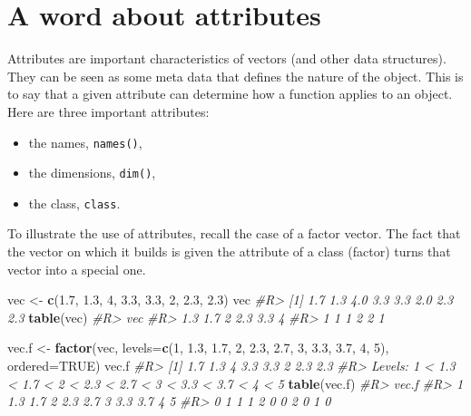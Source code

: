 \documentclass[]{book}
\newenvironment{Shaded}{}{}
\newcommand{\CommentTok}[1]{\textcolor[rgb]{0.38,0.63,0.69}{\textit{#1}}}
\newcommand{\DataTypeTok}[1]{\textcolor[rgb]{0.56,0.13,0.00}{#1}}
\newcommand{\DecValTok}[1]{\textcolor[rgb]{0.25,0.63,0.44}{#1}}
\newcommand{\FloatTok}[1]{\textcolor[rgb]{0.25,0.63,0.44}{#1}}
\newcommand{\KeywordTok}[1]{\textcolor[rgb]{0.00,0.44,0.13}{\textbf{#1}}}
\newcommand{\NormalTok}[1]{#1}
\newcommand{\OtherTok}[1]{\textcolor[rgb]{0.00,0.44,0.13}{#1}}
\newcommand{\StringTok}[1]{\textcolor[rgb]{0.25,0.44,0.63}{#1}}
\providecommand{\tightlist}{%
  \setlength{\itemsep}{0pt}\setlength{\parskip}{0pt}}
\theoremstyle{definition}
\theoremstyle{definition}
\theoremstyle{definition}
\theoremstyle{remark}
\begin{document}
\hypertarget{a-word-about-attributes}{%
\section{A word about attributes}\label{a-word-about-attributes}}

Attributes are important characteristics of vectors (and other data
structures).\\
They can be seen as some meta data that defines the nature of the
object. This is to say that a given attribute can determine how a
function applies to an object. Here are three important attributes:

\begin{itemize}
\tightlist
\item
  the names, \texttt{names()},
\item
  the dimensions, \texttt{dim()},
\item
  the class, \texttt{class}.
\end{itemize}

To illustrate the use of attributes, recall the case of a factor vector.
The fact that the vector on which it builds is given the attribute of a
class (factor) turns that vector into a special one.

\begin{Shaded}
\begin{Highlighting}[]
\NormalTok{vec <-}\StringTok{ }\KeywordTok{c}\NormalTok{(}\FloatTok{1.7}\NormalTok{, }\FloatTok{1.3}\NormalTok{, }\DecValTok{4}\NormalTok{, }\FloatTok{3.3}\NormalTok{, }\FloatTok{3.3}\NormalTok{, }\DecValTok{2}\NormalTok{, }\FloatTok{2.3}\NormalTok{, }\FloatTok{2.3}\NormalTok{)}
\NormalTok{vec}
\CommentTok{#R> [1] 1.7 1.3 4.0 3.3 3.3 2.0 2.3 2.3}
\KeywordTok{table}\NormalTok{(vec)}
\CommentTok{#R> vec}
\CommentTok{#R> 1.3 1.7   2 2.3 3.3   4 }
\CommentTok{#R>   1   1   1   2   2   1}

\NormalTok{vec.f <-}\StringTok{ }\KeywordTok{factor}\NormalTok{(vec,}
                \DataTypeTok{levels=}\KeywordTok{c}\NormalTok{(}\DecValTok{1}\NormalTok{, }\FloatTok{1.3}\NormalTok{, }\FloatTok{1.7}\NormalTok{, }\DecValTok{2}\NormalTok{, }\FloatTok{2.3}\NormalTok{, }\FloatTok{2.7}\NormalTok{, }\DecValTok{3}\NormalTok{, }\FloatTok{3.3}\NormalTok{, }\FloatTok{3.7}\NormalTok{, }\DecValTok{4}\NormalTok{, }\DecValTok{5}\NormalTok{),}
                \DataTypeTok{ordered=}\OtherTok{TRUE}\NormalTok{)}
\NormalTok{vec.f}
\CommentTok{#R> [1] 1.7 1.3 4   3.3 3.3 2   2.3 2.3}
\CommentTok{#R> Levels: 1 < 1.3 < 1.7 < 2 < 2.3 < 2.7 < 3 < 3.3 < 3.7 < 4 < 5}
\KeywordTok{table}\NormalTok{(vec.f)}
\CommentTok{#R> vec.f}
\CommentTok{#R>   1 1.3 1.7   2 2.3 2.7   3 3.3 3.7   4   5 }
\CommentTok{#R>   0   1   1   1   2   0   0   2   0   1   0}
\end{Highlighting}
\end{Shaded}
\end{document}
